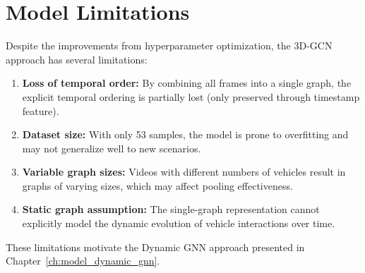 \section{Model Limitations}

Despite the improvements from hyperparameter optimization, the 3D-GCN approach has several limitations:

\begin{enumerate}
    \item \textbf{Loss of temporal order:} By combining all frames into a single graph, the explicit temporal ordering is partially lost (only preserved through timestamp feature).
    
    \item \textbf{Dataset size:} With only 53 samples, the model is prone to overfitting and may not generalize well to new scenarios.
    
    \item \textbf{Variable graph sizes:} Videos with different numbers of vehicles result in graphs of varying sizes, which may affect pooling effectiveness.
    
    \item \textbf{Static graph assumption:} The single-graph representation cannot explicitly model the dynamic evolution of vehicle interactions over time.
\end{enumerate}

These limitations motivate the Dynamic GNN approach presented in Chapter~\ref{ch:model_dynamic_gnn}.




